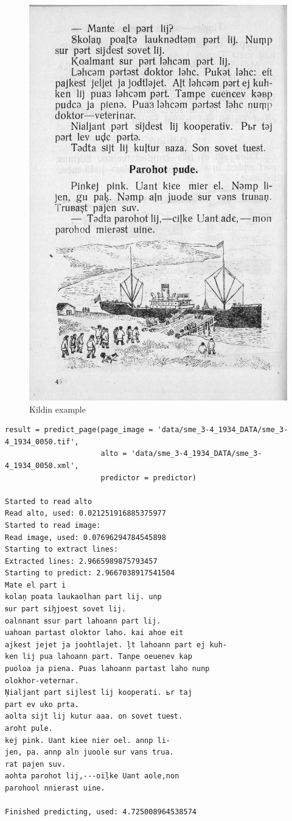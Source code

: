 \documentclass[]{book}
\begin{document}
\begin{figure}
\centering
\includegraphics{./images/sme_example.jpg}
\caption{Kildin example}
\end{figure}

\begin{verbatim}
result = predict_page(page_image = 'data/sme_3-4_1934_DATA/sme_3-4_1934_0050.tif', 
                      alto = 'data/sme_3-4_1934_DATA/sme_3-4_1934_0050.xml',
                      predictor = predictor)

Started to read alto
Read alto, used: 0.021251916885375977
Started to read image:
Read image, used: 0.07696294784545898
Starting to extract lines:
Extracted lines: 2.9665989875793457
Starting to predict: 2.9667038917541504
Mate el part i
kolaņ poata laukaolhan part lij. unp
ꞩur part siꜧjoest sovet lij.
oalnnant ꞩsur part lahoann part lij.
uahoan partast oloktor laho. kai ahoe eit
ajkest jejet ja joohtlajet. ļt lahoann part ej kuh-
ken lij pua lahoann part. Tanpe oeuenev kap
puoloa ja piena. Puas lahoann partast laho nunp
olokhor-veternar.
Ņialjant part sijlest lij kooperati. ьr taj
part ev uko prta.
aolta sijt lij kutur aaa. on sovet tueꞩt.
aroht pule.
kej pink. Uant kiee nier oel. annp li-
jen, pa. annp aln juoole ꞩur vans trua.
rat pajen suv.
aohta parohot lij,---oiļke Uant aole,non
parohool nnierast uine.

Finished predicting, used: 4.725008964538574
\end{verbatim}
\end{document}
